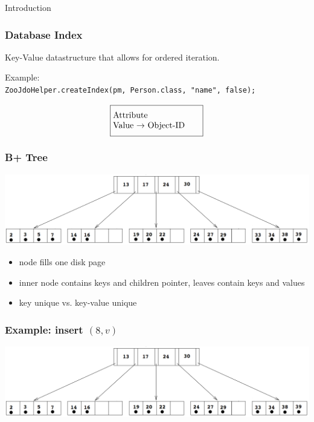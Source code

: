 \documentclass{beamer}
\begin{document}
\begin{section}{Introduction}
\begin{frame}
    \end{frame}
    \begin{frame}
      \frametitle{Database Index}
      \begin{block}{}
          Key-Value datastructure that allows for ordered iteration.
      \end{block}
      \vspace{1em}
      \pause
      Example: \\
      \texttt{ZooJdoHelper.createIndex(pm, Person.class, "name", false);}
      \pause
      \begin{align*}
      \fbox{\parbox[t][3em][c]{0.29\textwidth}{Attribute \\ Value $\rightarrow$ Object-ID} }
      \end{align*}
      \pause
      \begin{center}
      \end{center}
    \end{frame}
    \begin{frame}
      \frametitle{B+ Tree}
      \vspace{-3em}
      \includegraphics[scale=0.2]{B+Tree.png}
      \vspace{1em}
      \begin{itemize}
        \item node fills one disk page
        \item inner node contains keys and children pointer, leaves contain keys and values
        \item key unique vs. key-value unique
      \end{itemize}
    \end{frame}
    \begin{frame}
      \frametitle{Example: insert $(8,v)$}
      \vspace{-1em}
      \begin{center}
      \includegraphics[scale=0.17]{B+Tree.png}
      \end{center}
      \pause


\end{frame}
\end{section}
\end{document}

